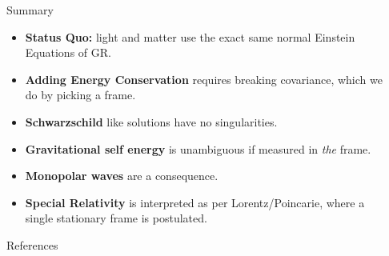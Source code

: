 \documentclass[final]{beamer}
\newlength{\sepwidth}
\newlength{\colwidth}
\newcommand{\separatorcolumn}{\begin{column}{\sepwidth}\end{column}}
\begin{document}
\begin{frame}[t]
\begin{columns}[t]
\begin{column}{\colwidth}
  \begin{alertblock}{Summary}
    \begin{itemize}
      \item \textbf{Status Quo:} light and matter use the exact same normal Einstein Equations of GR.
      \item \textbf{Adding Energy Conservation} requires breaking covariance, which we do by picking a frame.
      \item \textbf{Schwarzschild} like solutions have no singularities.
       \item \textbf{Gravitational self energy} is unambiguous if measured in \textit{the} frame.
       \item \textbf{Monopolar waves} are a consequence.
       \item \textbf{Special Relativity} is interpreted as per Lorentz/Poincarie, where a single stationary frame is postulated.
       
    \end{itemize}
  \end{alertblock}

\begin{block}{References}
\printbibliography
\end{block}

\end{column}


\separatorcolumn
\end{columns}
\end{frame}
\end{document}
